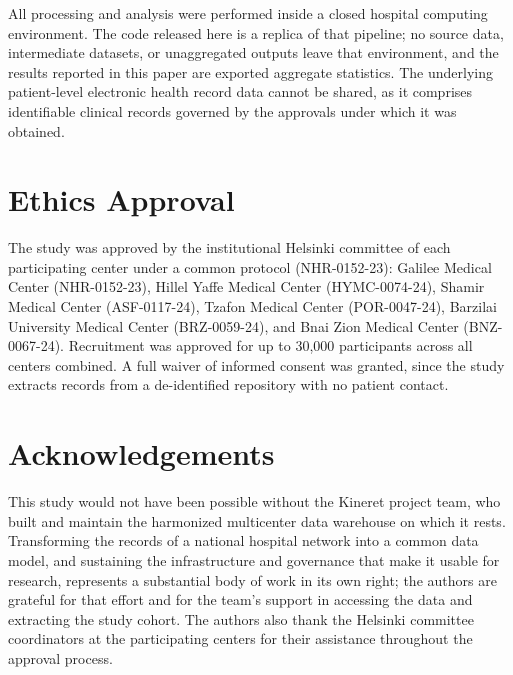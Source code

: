 \documentclass[preprint,12pt]{elsarticle}
\begin{document}
All processing and analysis were performed inside a closed hospital
computing environment. The code released here is a replica of that
pipeline; no source data, intermediate datasets, or unaggregated outputs
leave that environment, and the results reported in this paper are exported
aggregate statistics. The underlying patient-level electronic health record
data cannot be shared, as it comprises identifiable clinical records
governed by the approvals under which it was obtained.

\section*{Ethics Approval}
The study was approved by the institutional Helsinki committee of each
participating center under a common protocol (NHR-0152-23): Galilee Medical
Center (NHR-0152-23), Hillel Yaffe Medical Center (HYMC-0074-24), Shamir
Medical Center (ASF-0117-24), Tzafon Medical Center (POR-0047-24), Barzilai
University Medical Center (BRZ-0059-24), and Bnai Zion Medical Center
(BNZ-0067-24). Recruitment was approved for up to 30,000 participants across
all centers combined. A full waiver of informed consent was granted, since
the study extracts records from a de-identified repository with no patient
contact.

\section*{Acknowledgements}
This study would not have been possible without the Kineret project team,
who built and maintain the harmonized multicenter data warehouse on which it
rests. Transforming the records of a national hospital network into a
common data model, and sustaining the infrastructure and governance that
make it usable for research, represents a substantial body of work in its
own right; the authors are grateful for that effort and for the team's
support in accessing the data and extracting the study cohort. The authors
also thank the Helsinki committee coordinators at the participating centers
for their assistance throughout the approval process.





\end{document}
